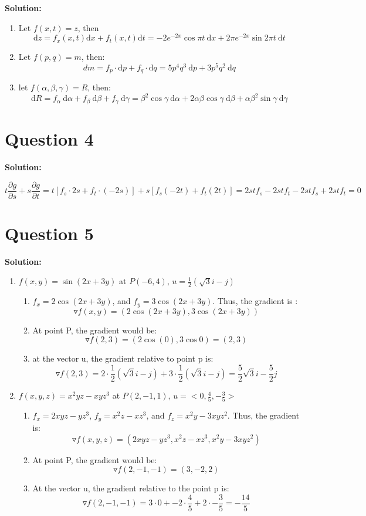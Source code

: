 \documentclass[11pt]{article} %
\begin{document}
\textbf{Solution:}
	
\begin{enumerate}
	\item Let $f(x,t)=z$, then 
	$$\mathrm{d}z=f_x(x,t)\mathrm{d}x+f_t(x,t)\mathrm{d}t=-2e^{-2x}\cos\pi t \ \mathrm{d}x+2\pi e^{-2x}\sin 2\pi t  \  \mathrm{d}t$$
	\item Let $f(p,q)=m$, then: 
	$$dm=f_p\cdot \mathrm{d}p+f_q \cdot \mathrm{d}q=5p^4q^3\ \mathrm{d}p+3p^5q^2\ \mathrm{d}q$$
	\item let $f(\alpha, \beta, \gamma)=R$, then: 
	$$\mathrm{d}R=f_\alpha \ \mathrm{d}\alpha+f_\beta \ \mathrm{d}\beta+f_\gamma \ \mathrm{d}\gamma=\beta^2\cos \gamma \ \mathrm{d}\alpha+2\alpha\beta\cos \gamma \ \mathrm{d}\beta+\alpha\beta^2\sin \gamma \ \mathrm{d}\gamma$$
	
\end{enumerate}

\section{Question 4}

\textbf{Solution: }

$$t\frac{\partial g}{\partial s}+s\frac{\partial g}{\partial t}=t\left[f_s\cdot 2s+f_t\cdot (-2s)\right]+s\left[f_s(-2t)+f_t(2t)\right]=2stf_s-2stf_t-2stf_s+2stf_t=0$$

\section{Question 5}
\textbf{Solution: }

\begin{enumerate}
	\item $f(x,y)=\sin(2x+3y)$ at $P(-6,4)$, $u=\frac{1}{2}(\sqrt{3}i-j)$
	\begin{enumerate}
		\item $f_x=2\cos(2x+3y)$, and $f_y=3\cos(2x+3y)$. Thus, the gradient is :
		$$\triangledown f(x,y)=(2\cos(2x+3y),3\cos(2x+3y))$$
		\item At point P, the gradient would be:
		$$\triangledown f(2,3)=(2\cos(0),3\cos 0)=(2,3)$$
		\item at the vector u, the gradient relative to point p is:
		$$\triangledown f(2,3)=2\cdot \frac{1}{2}(\sqrt{3}i-j)+3\cdot \frac{1}{2}(\sqrt{3}i-j)=\frac{5}{2}\sqrt{3}i-\frac{5}{2}j$$
	\end{enumerate}
\item $f(x,y,z)=x^2yz-xyz^3$ at $P(2,-1,1)$, $u=<0,\frac{4}{5},-\frac{3}{5}>$
\begin{enumerate}
	\item $f_x=2xyz-yz^3$, $f_y=x^2z-xz^3$, and $f_z=x^2y-3xyz^2$. Thus, the gradient is:
	$$\triangledown f(x,y,z)=(2xyz-yz^3, x^2z-xz^3, x^2y-3xyz^2)$$
	\item At point P, the gradient would be:
	$$\triangledown f(2,-1,-1)=(3,-2,2)$$
	\item At the vector u, the gradient relative to the point p is:
	$$\triangledown f(2,-1,-1)=3\cdot 0+-2\cdot \frac{4}{5}+2\cdot  -\frac{3}{5}=-\frac{14}{5}$$
\end{enumerate}
\end{enumerate}
\end{document}
